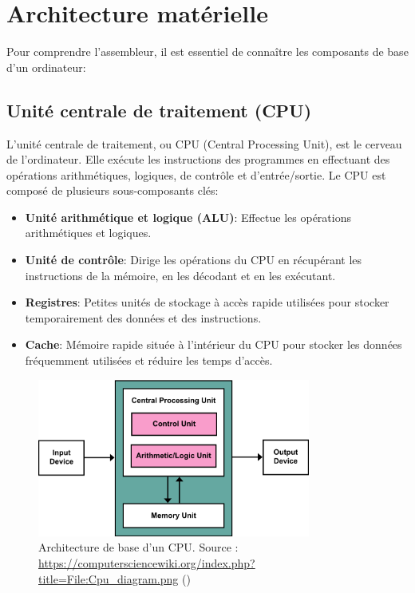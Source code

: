 \documentclass[a4paper, 12pt]{report}
\begin{document}
\chapter{Architecture matérielle}
Pour comprendre l'assembleur, il est essentiel de connaître les composants de base d'un ordinateur:

\section{Unité centrale de traitement (CPU)}
L'unité centrale de traitement, ou CPU (Central Processing Unit), est le cerveau de l'ordinateur. Elle exécute les instructions des programmes en effectuant des opérations arithmétiques, logiques, de contrôle et d'entrée/sortie. Le CPU est composé de plusieurs sous-composants clés:
\begin{itemize}
  \item \textbf{Unité arithmétique et logique (ALU)}: Effectue les opérations arithmétiques et logiques.
  \item \textbf{Unité de contrôle}: Dirige les opérations du CPU en récupérant les instructions de la mémoire, en les décodant et en les exécutant.
  \item \textbf{Registres}: Petites unités de stockage à accès rapide utilisées pour stocker temporairement des données et des instructions.
  \item \textbf{Cache}: Mémoire rapide située à l'intérieur du CPU pour stocker les données fréquemment utilisées et réduire les temps d'accès.
\end{itemize}

\begin{figure}[H]
  \centering
  \includegraphics[width=0.8\textwidth]{imgs/Cpu_diagram.jpg}
  \caption{Architecture de base d'un CPU. Source : \url{https://computersciencewiki.org/index.php?title=File:Cpu_diagram.png} (\cite{5})}
\end{figure}
\end{document}
